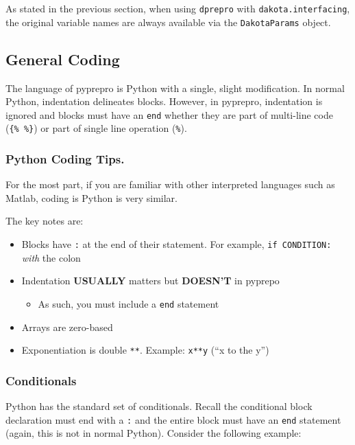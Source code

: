 As stated in the previous section, when using \texttt{dprepro} with 
\texttt{dakota.interfacing}, the original variable names are always available
via the \texttt{DakotaParams} object.

\subsection{General Coding}\label{interfaces:general-coding}

The language of pyprepro is Python with a single, slight modification.
In normal Python, indentation delineates blocks. However, in pyprepro,
indentation is ignored and blocks must have an \texttt{end} whether they
are part of multi-line code (\texttt{\{\%\ \%\}}) or part of single line
operation (\texttt{\%}).

\subsubsection{Python Coding Tips.}\label{python-coding-tips.}

For the most part, if you are familiar with other interpreted languages
such as Matlab, coding is Python is very similar.

The key notes are:

\begin{itemize}
\tightlist
\item
  Blocks have \texttt{:} at the end of their statement. For example,
  \texttt{if\ CONDITION:} \emph{with} the colon
\item
  Indentation \textbf{USUALLY} matters but \textbf{DOESN'T} in pyprepo

  \begin{itemize}
  \tightlist
  \item
    As such, you must include a \texttt{end} statement
  \end{itemize}
\item
  Arrays are zero-based
\item
  Exponentiation is double \texttt{**}. Example: \texttt{x**y} (``x to
  the y'')
\end{itemize}

\subsubsection{Conditionals}\label{conditionals}

Python has the standard set of conditionals. Recall the conditional
block declaration must end with a \texttt{:} and the entire block must
have an \texttt{end} statement (again, this is not in normal Python).
Consider the following example:

